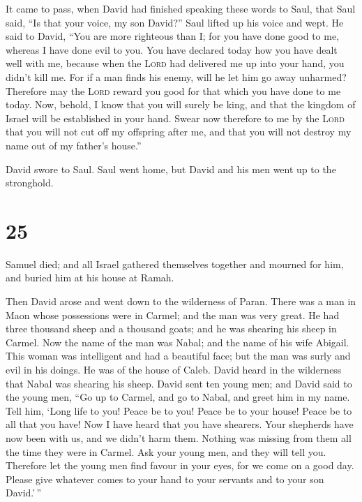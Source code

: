  It came to pass, when David had finished speaking these
words to Saul, that Saul said, ``Is that your voice, my son David?''
Saul lifted up his voice and wept.  He said to David,
``You are more righteous than I; for you have done good to me, whereas I
have done evil to you.  You have declared today how you
have dealt well with me, because when the \textsc{Lord} had delivered me
up into your hand, you didn't kill me.  For if a man
finds his enemy, will he let him go away unharmed? Therefore may the
\textsc{Lord} reward you good for that which you have done to me today.
 Now, behold, I know that you will surely be king, and
that the kingdom of Israel will be established in your hand.
 Swear now therefore to me by the \textsc{Lord} that you
will not cut off my offspring after me, and that you will not destroy my
name out of my father's house.''

 David swore to Saul. Saul went home, but David and his
men went up to the stronghold.

\hypertarget{section-24}{%
\section{25}\label{section-24}}

 Samuel died; and all Israel gathered themselves together
and mourned for him, and buried him at his house at Ramah.

Then David arose and went down to the wilderness of Paran.
 There was a man in Maon whose possessions were in Carmel;
and the man was very great. He had three thousand sheep and a thousand
goats; and he was shearing his sheep in Carmel.  Now the
name of the man was Nabal; and the name of his wife Abigail. This woman
was intelligent and had a beautiful face; but the man was surly and evil
in his doings. He was of the house of Caleb.  David heard
in the wilderness that Nabal was shearing his sheep. 
David sent ten young men; and David said to the young men, ``Go up to
Carmel, and go to Nabal, and greet him in my name.  Tell
him, `Long life to you! Peace be to you! Peace be to your house! Peace
be to all that you have!  Now I have heard that you have
shearers. Your shepherds have now been with us, and we didn't harm them.
Nothing was missing from them all the time they were in Carmel.
 Ask your young men, and they will tell you. Therefore let
the young men find favour in your eyes, for we come on a good day.
Please give whatever comes to your hand to your servants and to your son
David.'\,''


